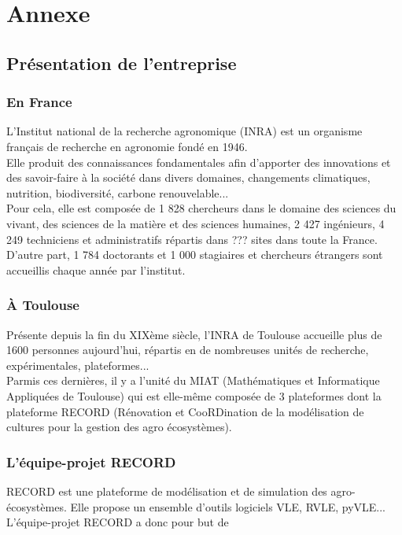 \chapter{Annexe}
\setlength{\parskip}{2.5ex plus .4ex minus .4ex}
\section{Présentation de l'entreprise}
\subsection{En France}
L'Institut national de la recherche agronomique (INRA) est un organisme français de recherche en agronomie fondé en 1946.\\
Elle produit des connaissances fondamentales afin d'apporter des innovations et des savoir-faire à la société dans divers domaines, changements climatiques, nutrition, biodiversité, carbone renouvelable...\\
Pour cela, elle est composée de 1 828 chercheurs dans le domaine des sciences du vivant, des sciences de la matière et des sciences humaines, 2 427 ingénieurs, 4 249 techniciens et administratifs répartis dans ??? sites dans toute la France. D'autre part, 1 784 doctorants et 1 000 stagiaires et chercheurs étrangers sont accueillis chaque année par l'institut.

\subsection{À Toulouse}
Présente depuis la fin du XIXème siècle, l'INRA de Toulouse accueille plus de 1600 personnes aujourd'hui, répartis en de nombreuses unités de recherche, expérimentales, plateformes...\\
Parmis ces dernières, il y a l'unité du MIAT (Mathématiques et Informatique Appliquées de Toulouse) qui est elle-même composée de 3 plateformes dont la plateforme RECORD (Rénovation et CooRDination de la modélisation de cultures pour la gestion des agro écosystèmes).

\subsection{L'équipe-projet RECORD}
RECORD est une plateforme de modélisation et de simulation des agro-écosystèmes. Elle propose un ensemble d'outils logiciels VLE, RVLE, pyVLE...\\
L'équipe-projet RECORD a donc pour but de